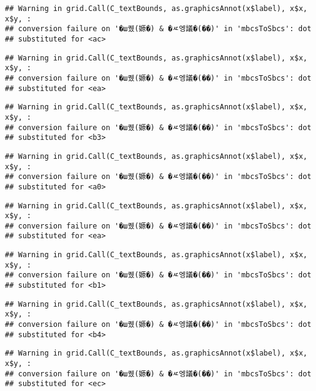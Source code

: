 \documentclass[
]{article}
\begin{document}
\begin{verbatim}
## Warning in grid.Call(C_textBounds, as.graphicsAnnot(x$label), x$x, x$y, :
## conversion failure on '�ш퀬(嫄�) & �ㅼ엥議�(��)' in 'mbcsToSbcs': dot
## substituted for <ac>
\end{verbatim}

\begin{verbatim}
## Warning in grid.Call(C_textBounds, as.graphicsAnnot(x$label), x$x, x$y, :
## conversion failure on '�ш퀬(嫄�) & �ㅼ엥議�(��)' in 'mbcsToSbcs': dot
## substituted for <ea>
\end{verbatim}

\begin{verbatim}
## Warning in grid.Call(C_textBounds, as.graphicsAnnot(x$label), x$x, x$y, :
## conversion failure on '�ш퀬(嫄�) & �ㅼ엥議�(��)' in 'mbcsToSbcs': dot
## substituted for <b3>
\end{verbatim}

\begin{verbatim}
## Warning in grid.Call(C_textBounds, as.graphicsAnnot(x$label), x$x, x$y, :
## conversion failure on '�ш퀬(嫄�) & �ㅼ엥議�(��)' in 'mbcsToSbcs': dot
## substituted for <a0>
\end{verbatim}

\begin{verbatim}
## Warning in grid.Call(C_textBounds, as.graphicsAnnot(x$label), x$x, x$y, :
## conversion failure on '�ш퀬(嫄�) & �ㅼ엥議�(��)' in 'mbcsToSbcs': dot
## substituted for <ea>
\end{verbatim}

\begin{verbatim}
## Warning in grid.Call(C_textBounds, as.graphicsAnnot(x$label), x$x, x$y, :
## conversion failure on '�ш퀬(嫄�) & �ㅼ엥議�(��)' in 'mbcsToSbcs': dot
## substituted for <b1>
\end{verbatim}

\begin{verbatim}
## Warning in grid.Call(C_textBounds, as.graphicsAnnot(x$label), x$x, x$y, :
## conversion failure on '�ш퀬(嫄�) & �ㅼ엥議�(��)' in 'mbcsToSbcs': dot
## substituted for <b4>
\end{verbatim}

\begin{verbatim}
## Warning in grid.Call(C_textBounds, as.graphicsAnnot(x$label), x$x, x$y, :
## conversion failure on '�ш퀬(嫄�) & �ㅼ엥議�(��)' in 'mbcsToSbcs': dot
## substituted for <ec>
\end{verbatim}
\end{document}
